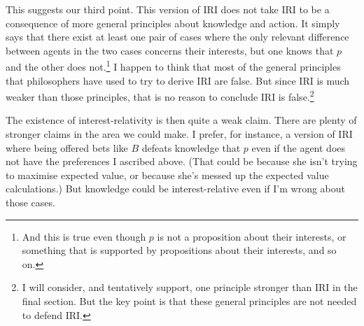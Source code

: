 \documentclass[oneside]{book}
\begin{document}
%
%

This suggests our third point. This version of IRI does not take IRI to be a consequence of more general principles about knowledge and action. It simply says that there exist at least one pair of cases where the only relevant difference between agents in the two cases concerns their interests, but one knows that $p$ and the other does not.\footnote{And this is true even though $p$ is not a proposition about their interests, or something that is supported by propositions about their interests, and so on.} I happen to think that most of the general principles that philosophers have used to try to derive IRI are false. But since IRI is much weaker than those principles, that is no reason to conclude IRI is false.\footnote{I will consider, and tentatively support, one principle stronger than IRI in the final section. But the key point is that these general principles are not needed to defend IRI.}

The existence of interest-relativity is then quite a weak claim. There are plenty of stronger claims in the area we could make. I prefer, for instance, a version of IRI where being offered bets like $B$ defeats knowledge that $p$ even if the agent does not have the preferences I ascribed above. (That could be because she isn't trying to maximise expected value, or because she's messed up the expected value calculations.) But knowledge could be interest-relative even if I'm wrong about those cases.
\end{document}
